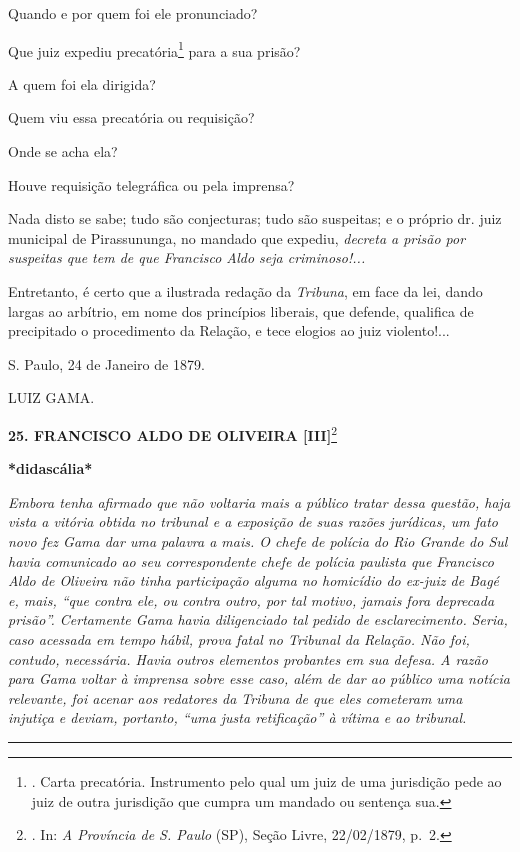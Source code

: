 Quando e por quem foi ele pronunciado?

Que juiz expediu precatória\footnote{. Carta precatória. Instrumento
  pelo qual um juiz de uma jurisdição pede ao juiz de outra jurisdição
  que cumpra um mandado ou sentença sua.} para a sua prisão?

A quem foi ela dirigida?

Quem viu essa precatória ou requisição?

Onde se acha ela?

Houve requisição telegráfica ou pela imprensa?

Nada disto se sabe; tudo são conjecturas; tudo são suspeitas; e o
próprio dr. juiz municipal de Pirassununga, no mandado que expediu,
\emph{decreta a prisão por suspeitas que tem de que Francisco Aldo seja
criminoso!...}

Entretanto, é certo que a ilustrada redação da \emph{Tribuna}, em face
da lei, dando largas ao arbítrio, em nome dos princípios liberais, que
defende, qualifica de precipitado o procedimento da Relação, e tece
elogios ao juiz violento!...

S. Paulo, 24 de Janeiro de 1879.

LUIZ GAMA.

\textbf{25. FRANCISCO ALDO DE OLIVEIRA {[}III{]}}\footnote{. In: \emph{A
  Província de S. Paulo} (SP), Seção Livre, 22/02/1879, p.~2.}

\textbf{*didascália*}

\emph{Embora tenha afirmado que não voltaria mais a público tratar dessa
questão, haja vista a vitória obtida no tribunal e a exposição de suas
razões jurídicas, um fato novo fez Gama dar uma palavra a mais. O chefe
de polícia do Rio Grande do Sul havia comunicado ao seu correspondente
chefe de polícia paulista que Francisco Aldo de Oliveira não tinha
participação alguma no homicídio do ex-juiz de Bagé e, mais, ``que
contra ele, ou contra outro, por tal motivo, jamais fora deprecada
prisão''. Certamente Gama havia diligenciado tal pedido de
esclarecimento. Seria, caso acessada em tempo hábil, prova fatal no
Tribunal da Relação. Não foi, contudo, necessária. Havia outros
elementos probantes em sua defesa. A razão para Gama voltar à imprensa
sobre esse caso, além de dar ao público uma notícia relevante, foi
acenar aos redatores da Tribuna de que eles cometeram uma injutiça e
deviam, portanto, ``uma justa retificação'' à vítima e ao tribunal. }

\begin{center}\rule{0.5\linewidth}{\linethickness}\end{center}

